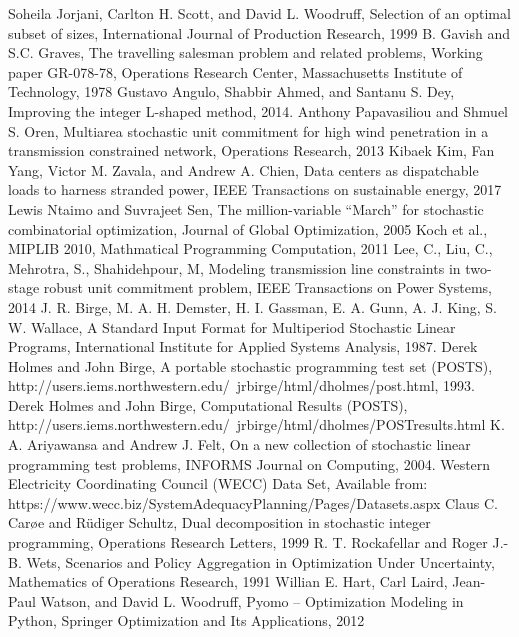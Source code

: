 \begin{thebibliography}{9}
	Soheila Jorjani, Carlton H. Scott, and David L. Woodruff, Selection of an optimal subset of sizes, International Journal of Production Research, 1999	
	B. Gavish and S.C. Graves, The travelling salesman problem and related problems, Working paper GR-078-78, Operations Research Center, Massachusetts Institute of Technology, 1978
	Gustavo Angulo, Shabbir Ahmed, and Santanu S. Dey, Improving the integer L-shaped method, 2014.
	Anthony Papavasiliou and Shmuel S. Oren, Multiarea stochastic unit commitment for high wind penetration in a transmission constrained network, Operations Research, 2013
	Kibaek Kim, Fan Yang, Victor M. Zavala, and Andrew A. Chien, Data centers as dispatchable loads to harness stranded power, IEEE Transactions on sustainable energy, 2017
	Lewis Ntaimo and Suvrajeet Sen, The million-variable ``March'' for stochastic combinatorial optimization, Journal of Global Optimization, 2005
	Koch et al., MIPLIB 2010, Mathmatical Programming Computation, 2011
	Lee, C., Liu, C., Mehrotra, S., Shahidehpour, M, Modeling transmission line constraints in two-stage robust unit commitment problem, IEEE Transactions on Power Systems, 2014
	J. R. Birge, M. A. H. Demster, H. I. Gassman, E. A. Gunn, A. J. King, S. W. Wallace, A Standard Input Format for Multiperiod Stochastic Linear Programs, International Institute for Applied Systems Analysis, 1987.
	Derek Holmes and John Birge, A portable stochastic programming test set (POSTS), http://users.iems.northwestern.edu/~jrbirge/html/dholmes/post.html, 1993.
	Derek Holmes and John Birge, Computational Results (POSTS), http://users.iems.northwestern.edu/~jrbirge/html/dholmes/POSTresults.html
	K. A. Ariyawansa and Andrew J. Felt, On a new collection of stochastic linear programming test problems, INFORMS Journal on Computing, 2004.
    Western Electricity Coordinating Council (WECC) Data Set, Available from: https://www.wecc.biz/SystemAdequacyPlanning/Pages/Datasets.aspx 
    Claus C. Car\o e and Rüdiger Schultz, Dual decomposition in stochastic integer programming, Operations Research Letters, 1999
    R. T. Rockafellar and Roger J.-B. Wets, Scenarios and Policy Aggregation in Optimization Under Uncertainty, Mathematics of Operations Research, 1991
    Willian E. Hart, Carl Laird, Jean-Paul Watson, and David L. Woodruff, Pyomo – Optimization Modeling in Python, Springer Optimization and Its Applications, 2012
\end{thebibliography}